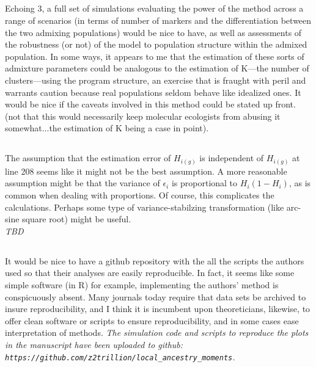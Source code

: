 \documentclass[11pt]{amsart}
\begin{document}
\subsection{} Echoing 3, a full set of simulations evaluating the power of the method across a range of scenarios (in
terms of number of markers and the differentiation between the two admixing populations) would be nice to
have, as well as assessments of the robustness (or not) of the model to population structure within the
admixed population. In some ways, it appears to me that the estimation of these sorts of admixture
parameters could be analogous to the estimation of K---the number of clusters---using the program
structure, an exercise that is fraught with peril and warrants caution because real populations seldom
behave like idealized ones. It would be nice if the caveats involved in this method could be stated up front.
(not that this would necessarily keep molecular ecologists from abusing it somewhat...the estimation of K
being a case in point).

\subsection{} The assumption that the estimation error of $H_{i(g)}$ is independent of $H_{i(g)}$ at line 208 seems like it
might not be the best assumption. A more reasonable assumption might be that the variance of $\epsilon_i$
is proportional to $H_i(1-H_i)$, as is common when dealing with proportions. Of course, this complicates the
calculations. Perhaps some type of variance-stabilzing transformation (like arc-sine square root) might be
useful.\\
\textit{TBD}

\subsection{} It would be nice to have a github repository with the all the scripts the authors used so that their
analyses are easily reproducible. In fact, it seems like some simple software (in R) for example,
implementing the authors' method is conspicuously absent. Many journals today require that data sets be
archived to insure reproducibility, and I think it is incumbent upon theoreticians, likewise, to offer clean
software or scripts to ensure reproducibility, and in some cases ease interpretation of methods.
\textit{The simulation code and scripts to reproduce the plots in the manuscript have been uploaded to github:  \texttt{https://github.com/z2trillion/local\_ancestry\_moments}.}
\end{document}
